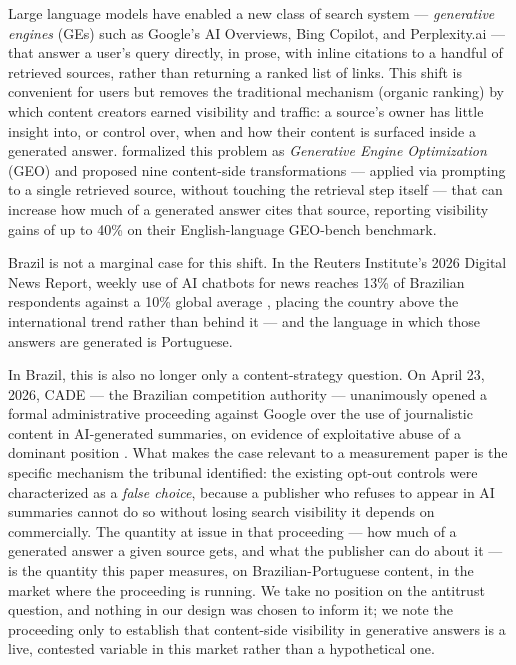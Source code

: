 \documentclass[11pt,a4paper]{article}
\begin{document}
Large language models have enabled a new class of search system ---
\emph{generative engines} (GEs) such as Google's AI Overviews, Bing Copilot,
and Perplexity.ai --- that answer a user's query directly, in prose, with
inline citations to a handful of retrieved sources, rather than returning a
ranked list of links. This shift is convenient for users but removes the
traditional mechanism (organic ranking) by which content creators earned
visibility and traffic: a source's owner has little insight into, or
control over, when and how their content is surfaced inside a generated
answer. \citet{aggarwal2024geo} formalized this problem as \emph{Generative
Engine Optimization} (GEO) and proposed nine content-side transformations ---
applied via prompting to a single retrieved source, without touching the
retrieval step itself --- that can increase how much of a generated answer
cites that source, reporting visibility gains of up to 40\% on their
English-language GEO-bench benchmark.

Brazil is not a marginal case for this shift. In the Reuters Institute's
2026 Digital News Report, weekly use of AI chatbots for news reaches 13\% of
Brazilian respondents against a 10\% global average
\citep{dnr2026}, placing the country above the international
trend rather than behind it --- and the language in which those answers are
generated is Portuguese.

In Brazil, this is also no longer only a content-strategy question. On April 23,
2026, CADE --- the Brazilian competition authority --- unanimously opened a
formal administrative proceeding against Google over the use of journalistic
content in AI-generated summaries, on evidence of exploitative abuse of a
dominant position \citep{cade2026google}. What makes the case relevant to a
measurement paper is the specific mechanism the tribunal identified: the
existing opt-out controls were characterized as a \emph{false choice},
because a publisher who refuses to appear in AI summaries cannot do so
without losing search visibility it depends on commercially. The quantity
at issue in that proceeding --- how much of a generated answer a given
source gets, and what the publisher can do about it --- is the quantity this
paper measures, on Brazilian-Portuguese content, in the market where the
proceeding is running. We take no position on the antitrust question, and
nothing in our design was chosen to inform it; we note the proceeding only
to establish that content-side visibility in generative answers is a live,
contested variable in this market rather than a hypothetical one.
\end{document}
